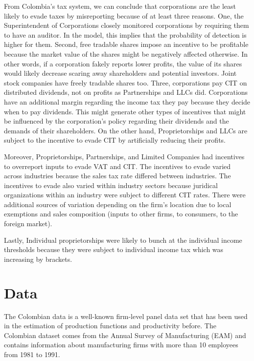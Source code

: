 \documentclass[
  12pt]{article}
\theoremstyle{definition}
\theoremstyle{remark}
\begin{document}
From Colombia's tax system, we can conclude that corporations are the
least likely to evade taxes by misreporting because of at least three
reasons. One, the Superintendent of Corporations closely monitored
corporations by requiring them to have an auditor. In the model, this
implies that the probability of detection is higher for them. Second,
free tradable shares impose an incentive to be profitable because the
market value of the shares might be negatively affected otherwise. In
other words, if a corporation fakely reports lower profits, the value of
its shares would likely decrease scaring away shareholders and potential
investors. Joint stock companies have freely tradable shares too. Three,
corporations pay CIT on distributed dividends, not on profits as
Partnerships and LLCs did. Corporations have an additional margin
regarding the income tax they pay because they decide when to pay
dividends. This might generate other types of incentives that might be
influenced by the corporation's policy regarding their dividends and the
demands of their shareholders. On the other hand, Proprietorships and
LLCs are subject to the incentive to evade CIT by artificially reducing
their profits.

Moreover, Proprietorships, Partnerships, and Limited Companies had
incentives to overreport inputs to evade VAT and CIT. The incentives to
evade varied across industries because the sales tax rate differed
between industries. The incentives to evade also varied within industry
sectors because juridical organizations within an industry were subject
to different CIT rates. There were additional sources of variation
depending on the firm's location due to local exemptions and sales
composition (inputs to other firms, to consumers, to the foreign
market).

Lastly, Individual proprietorships were likely to bunch at the
individual income thresholds because they were subject to individual
income tax which was increasing by brackets.

\section{Data}\label{data}

The Colombian data is a well-known firm-level panel data set that has
been used in the estimation of production functions and productivity
before. The Colombian dataset comes from the Annual Survey of
Manufacturing (EAM) and contains information about manufacturing firms
with more than 10 employees from 1981 to 1991.
\end{document}
